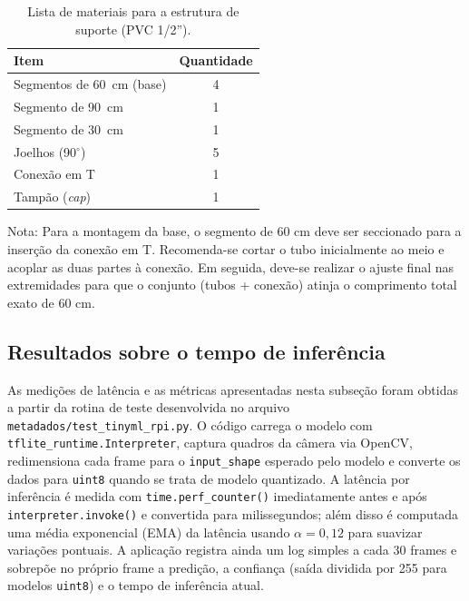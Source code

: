 \documentclass[repeatfields,xlists,xpacks,oneside]{ufrgscca}
\begin{document}
\begin{table}[H]
    \begin{center}  %
        \caption{Lista de materiais para a estrutura de suporte (PVC 1/2'').}
        \label{tab:lista_materiais}
        \begin{tabular}{l c}
            \hline
            \textbf{Item} & \textbf{Quantidade} \\
            \hline
            Segmentos de 60~cm (base) & 4 \\
            Segmento de 90~cm & 1 \\
            Segmento de 30~cm & 1 \\
            Joelhos (90$^{\circ}$) & 5 \\
            Conexão em T & 1 \\
            Tampão (\textit{cap}) & 1 \\
            \hline
        \end{tabular}
    \end{center}
    {}
\end{table}

Nota: Para a montagem da base, o segmento de 60 cm deve ser seccionado para a inserção da conexão em T. Recomenda-se cortar o tubo inicialmente ao meio e acoplar as duas partes à conexão. Em seguida, deve-se realizar o ajuste final nas extremidades para que o conjunto (tubos + conexão) atinja o comprimento total exato de 60 cm.

\subsection{Resultados sobre o tempo de inferência}
As medições de latência e as métricas apresentadas nesta subseção foram obtidas a partir da rotina de teste desenvolvida no arquivo \texttt{metadados/test\_tinyml\_rpi.py}. O código carrega o modelo com \texttt{tflite\_runtime.Interpreter}, captura quadros da câmera via OpenCV, redimensiona cada frame para o \texttt{input\_shape} esperado pelo modelo e converte os dados para \texttt{uint8} quando se trata de modelo quantizado. A latência por inferência é medida com \texttt{time.perf\_counter()} imediatamente antes e após \texttt{interpreter.invoke()} e convertida para milissegundos; além disso é computada uma média exponencial (EMA) da latência usando \(\alpha=0{,}12\) para suavizar variações pontuais. A aplicação registra ainda um log simples a cada 30 frames e sobrepõe no próprio frame a predição, a confiança (saída dividida por 255 para modelos \texttt{uint8}) e o tempo de inferência atual.
\end{document}
